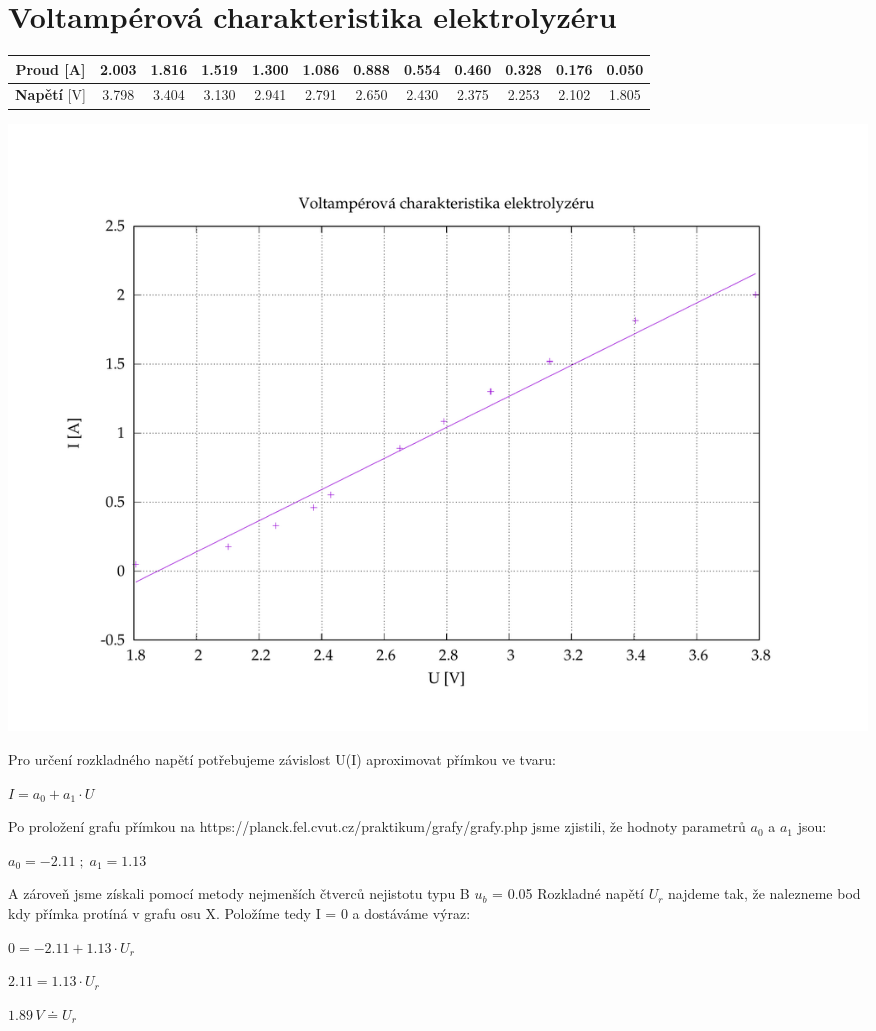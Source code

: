 \documentclass[11pt, a4paper]{report}
\begin{document}
\section{Voltampérová charakteristika elektrolyzéru}
\begin{center}
	\renewcommand{\arraystretch}{1.5}
	\begin{table}[h]
		\centering
		\begin{tabular}{|c|c|c|c|c|c|c|c|c|c|c|c|}
			\hline
			\textbf{Proud} [A]  & 2.003 & 1.816 & 1.519 & 1.300 & 1.086 & 0.888 & 0.554 & 0.460 & 0.328 & 0.176 & 0.050 \\

			\hline
			\textbf{Napětí} [V] & 3.798 & 3.404 & 3.130 & 2.941 & 2.791 & 2.650 & 2.430 & 2.375 & 2.253 & 2.102 & 1.805 \\

			\hline
		\end{tabular}
	\end{table}

	\includegraphics[width=1\textwidth, trim=2cm 1cm 3cm 1cm, clip]{VA_elektro.pdf}

\end{center}
\large
Pro určení rozkladného napětí potřebujeme závislost U(I) aproximovat přímkou ve tvaru:
\begin{center}
	\LARGE
	$I =  a_0 +a_1 \cdot U $
\end{center}
\large
Po proložení grafu přímkou na https://planck.fel.cvut.cz/praktikum/grafy/grafy.php
jsme zjistili, že hodnoty parametrů {\boldmath$a_0$ a $a_1$} jsou:

\begin{center}
	\Large
	$a_0 = -2.11 \;;\;a_1 = 1.13$
\end{center}
\large A zároveň jsme získali pomocí metody nejmenších čtverců nejistotu typu B \Large{\boldmath $u_b$ = 0.05}
\large
\clearpage
\noindent Rozkladné napětí {\boldmath$U_r$} najdeme tak, že nalezneme bod kdy přímka protíná v grafu osu X.
Položíme tedy I = 0 a dostáváme výraz:
\begin{center}
	\Large
	$0 = -2.11 + 1.13 \cdot U_r$

	$2.11 = 1.13 \cdot U_r$

	$1.89\,V \doteq U_r$
\end{center}
\end{document}
